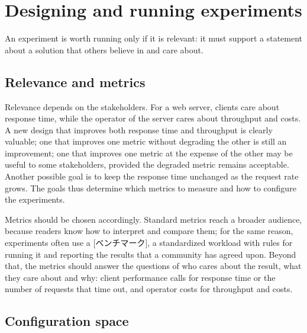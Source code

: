\documentclass[../main.tex]{subfiles}
\begin{document}
\section{Designing and running experiments}
\label{sec:l06-design}

An experiment is worth running only if it is relevant: it must support a
statement about a solution that others believe in and care
about.

\subsection{Relevance and metrics}

Relevance depends on the stakeholders.  For a web server, clients care about
response time, while the operator of the server cares about throughput and
costs.  A new design that improves both response
time and throughput is clearly valuable; one that improves one metric
without degrading the other is still an improvement; one that improves one
metric at the expense of the other may be useful to some stakeholders,
provided the degraded metric
remains acceptable.  Another possible goal is to keep the response time
unchanged as the request rate grows.  The goals thus determine which metrics
to measure and how to configure the experiments.

Metrics should be chosen accordingly.  Standard metrics reach a broader
audience, because readers know how to interpret and compare them; for the
same reason, experiments often use a [ベンチマーク], a
standardized workload with rules for running it and reporting the results
that a community has agreed upon.  Beyond that, the metrics should answer
the questions of who cares about the result, what they care about and why:
client performance calls for response time or the number of requests that
time out, and operator costs for throughput and costs.

\subsection{Configuration space}
\end{document}
